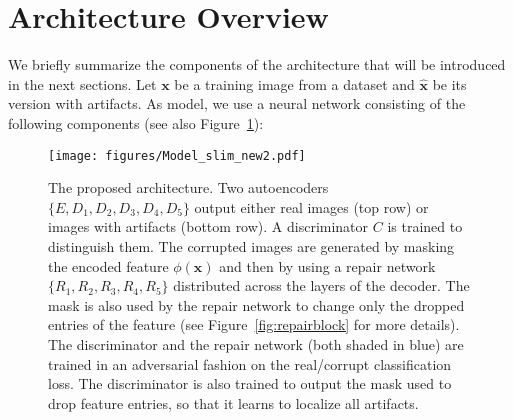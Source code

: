 \documentclass[10pt,twocolumn,letterpaper]{article}
\begin{document}
\section{Architecture Overview}

We briefly summarize the components of the architecture that will be introduced in the next sections.
Let $\mathbf{x}$ be a training image from a dataset and $\hat{\mathbf{x}}$ be its version with artifacts. %
As model, we use a neural network consisting of the following components (see also Figure~\ref{fig:architecture}):

\begin{figure*}[t]
\begin{center}
  \texttt{[image: figures/Model\_slim\_new2.pdf]}
\end{center}
   \caption{The proposed architecture. Two autoencoders $\{E,D_1,D_2,D_3,D_4,D_5\}$ output either real images (top row) or images with artifacts (bottom row). A discriminator $C$ is trained to distinguish them. The corrupted images are generated by masking the encoded feature $\phi(\mathbf{x})$ and then by using a repair network $\{R_1,R_2,R_3,R_4,R_5\}$ distributed across the layers of the decoder. The mask is also used by the repair network to change only the dropped entries of the feature (see Figure~\ref{fig:repairblock} for more details). The discriminator and the repair network (both shaded in blue) are trained in an adversarial fashion on the real/corrupt classification loss. The discriminator is also trained to output the mask used to drop feature entries, so that it learns to localize all artifacts.}
\label{fig:architecture}
\end{figure*}
\end{document}
